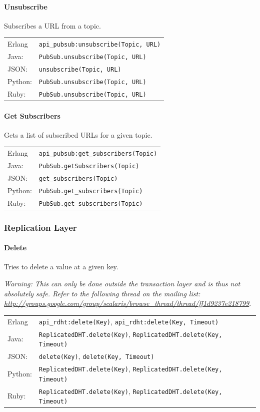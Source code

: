 \documentclass[a4paper]{scrreprt}
\newcommand{\code}[1]{\lstinline[basicstyle=\ttfamily]!#1!}
\begin{document}
\paragraph{Unsubscribe}
Subscribes a URL from a topic.

\begin{tabular}{lp{14cm}}
Erlang  & \code{api_pubsub:unsubscribe(Topic, URL)}\\
Java:   & \code{PubSub.unsubscribe(Topic, URL)}\\
JSON:   & \code{unsubscribe(Topic, URL)}\\
Python: & \code{PubSub.unsubscribe(Topic, URL)}\\
Ruby:   & \code{PubSub.unsubscribe(Topic, URL)}
\end{tabular}

\paragraph{Get Subscribers}
Gets a list of subscribed URLs for a given topic.

\begin{tabular}{lp{14cm}}
Erlang  & \code{api_pubsub:get_subscribers(Topic)}\\
Java:   & \code{PubSub.getSubscribers(Topic)}\\
JSON:   & \code{get_subscribers(Topic)}\\
Python: & \code{PubSub.get_subscribers(Topic)}\\
Ruby:   & \code{PubSub.get_subscribers(Topic)}
\end{tabular}

\subsubsection{Replication Layer}

\paragraph{Delete}
Tries to delete a value at a given key.

\emph{Warning: This can only be done outside the transaction layer and is thus not
absolutely safe. Refer to the following thread on the mailing list:
\url{http://groups.google.com/group/scalaris/browse_thread/thread/ff1d9237e218799}}.

\begin{tabular}{lp{14cm}}
Erlang  & \code{api_rdht:delete(Key)}, \code{api_rdht:delete(Key, Timeout)}\\
Java:   & \code{ReplicatedDHT.delete(Key)}, \code{ReplicatedDHT.delete(Key, Timeout)}\\
JSON:   & \code{delete(Key)}, \code{delete(Key, Timeout)}\\
Python: & \code{ReplicatedDHT.delete(Key)}, \code{ReplicatedDHT.delete(Key, Timeout)}\\
Ruby:   & \code{ReplicatedDHT.delete(Key)}, \code{ReplicatedDHT.delete(Key, Timeout)}
\end{tabular}
\end{document}
